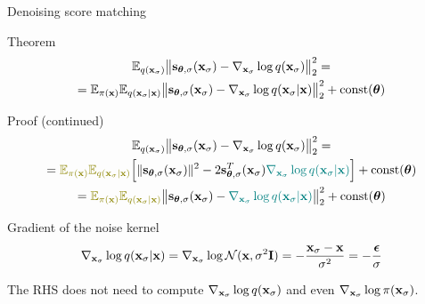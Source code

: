 \begin{frame}{Denoising score matching}
	\vspace{-0.3cm}
	\begin{block}{Theorem}
	\vspace{-0.7cm}
	\begin{multline*}
		\mathbb{E}_{q(\mathbf{x}_{\sigma})}\bigl\| \mathbf{s}_{\boldsymbol{\theta}, \sigma}(\mathbf{x}_{\sigma}) - \nabla_{\mathbf{x}_{\sigma}} \log q(\mathbf{x}_{\sigma}) \bigr\|^2_2 = \\
		= \mathbb{E}_{\pi(\mathbf{x})} \mathbb{E}_{q(\mathbf{x}_{\sigma} | \mathbf{x})}\bigl\| \mathbf{s}_{\boldsymbol{\theta}, \sigma}(\mathbf{x}_{\sigma}) - \nabla_{\mathbf{x}_{\sigma}} \log q(\mathbf{x}_{\sigma} | \mathbf{x}) \bigr\|^2_2 + \text{const}(\boldsymbol{\theta})
	\end{multline*}
	\vspace{-0.9cm}
	\end{block}
	\begin{block}{Proof (continued)}
		\vspace{-0.7cm}
		{\small
		\begin{multline*}
			\bbE_{q(\bx_{\sigma})}\bigl\| \bs_{\btheta, \sigma}(\bx_{\sigma}) - \nabla_{\bx_{\sigma}} \log q(\bx_{\sigma}) \bigr\|^2_2 = \\ 
			= {\color{olive}\bbE_{\pi(\bx)} \bbE_{q(\bx_{\sigma} | \bx)}}\Bigl[\| \bs_{\btheta, \sigma}(\bx_{\sigma}) \|^2 - 2 \bs_{\btheta, \sigma}^T(\bx_{\sigma}) {\color{teal}\nabla_{\bx_{\sigma}} \log q(\bx_{\sigma} | \bx)} \Bigr] + \text{const}(\btheta) \\
			= {\color{olive}\bbE_{\pi(\bx)} \bbE_{q(\bx_{\sigma} | \bx)}} \bigl\|\bs_{\btheta, \sigma}(\bx_{\sigma}) - {\color{teal}\nabla_{\bx_{\sigma}} \log q(\bx_{\sigma} | \bx)} \bigr\|_2^2 + \text{const}(\btheta)
		\end{multline*}
		}
		\vspace{-0.8cm}
	\end{block}
	\begin{block}{Gradient of the noise kernel}
	\vspace{-0.3cm}
	\[
		\nabla_{\mathbf{x}_{\sigma}} \log q(\mathbf{x}_{\sigma} | \mathbf{x}) = \nabla_{\mathbf{x}_{\sigma}} \log \mathcal{N}(\mathbf{x}, \sigma^2 \mathbf{I}) = - \frac{\mathbf{x}_{\sigma} - \mathbf{x}}{\sigma^2}  = - \frac{\boldsymbol{\epsilon}}{\sigma}
	\]
	\vspace{-0.5cm}
	\end{block}
	The RHS does not need to compute $\nabla_{\mathbf{x}_{\sigma}} \log q(\mathbf{x}_{\sigma})$ and even $\nabla_{\mathbf{x}_{\sigma}} \log \pi(\mathbf{x}_{\sigma})$.
\end{frame}
